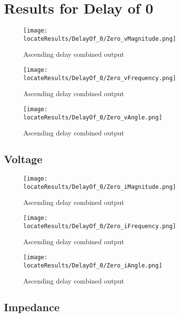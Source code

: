 \newpage
\section{Results for Delay of 0}

\begin{figure}[hb]
    \texttt{[image: \\locateResults/DelayOf\_0/Zero\_vMagnitude.png]}    
    \caption{Ascending delay combined output}
    \label{fig:PMUsim_Zero_iMagn}
\end{figure}

\begin{figure}[hb]
    \texttt{[image: \\locateResults/DelayOf\_0/Zero\_vFrequency.png]}    
    \caption{Ascending delay combined output}
    \label{fig:PMUsim_Zero_iFreq}
\end{figure}

\begin{figure}[hb]
    \texttt{[image: \\locateResults/DelayOf\_0/Zero\_vAngle.png]}    
    \caption{Ascending delay combined output}
    \label{fig:PMUsim_Zero_iAngle}
\end{figure}
\subsection{Voltage}


\begin{figure}[hb]
    \texttt{[image: \\locateResults/DelayOf\_0/Zero\_iMagnitude.png]}    
    \caption{Ascending delay combined output}
    \label{fig:PMUsim_Zero_iMagn}
\end{figure}

\begin{figure}[hb]
    \texttt{[image: \\locateResults/DelayOf\_0/Zero\_iFrequency.png]}    
    \caption{Ascending delay combined output}
    \label{fig:PMUsim_Zero_iFreq}
\end{figure}

\begin{figure}[hb]
    \texttt{[image: \\locateResults/DelayOf\_0/Zero\_iAngle.png]}    
    \caption{Ascending delay combined output}
    \label{fig:PMUsim_Zero_iAngle}
\end{figure}

\subsection{Impedance}
